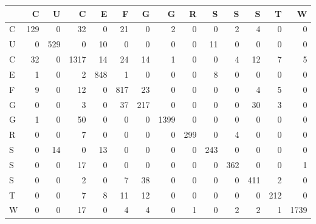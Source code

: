 \begin{tabular}{lrrrrrrrrrrrrr}
\toprule
{} &    C &    U &     C &    E &    F &    G &     G &    R &    S &    S &    S &    T &     W \\
\midrule
C &  129 &    0 &    32 &    0 &   21 &    0 &     2 &    0 &    0 &    2 &    4 &    0 &     0 \\
U &    0 &  529 &     0 &   10 &    0 &    0 &     0 &    0 &   11 &    0 &    0 &    0 &     0 \\
C &   32 &    0 &  1317 &   14 &   24 &   14 &     1 &    0 &    0 &    4 &   12 &    7 &     5 \\
E &    1 &    0 &     2 &  848 &    1 &    0 &     0 &    0 &    8 &    0 &    0 &    0 &     0 \\
F &    9 &    0 &    12 &    0 &  817 &   23 &     0 &    0 &    0 &    0 &    4 &    5 &     0 \\
G &    0 &    0 &     3 &    0 &   37 &  217 &     0 &    0 &    0 &    0 &   30 &    3 &     0 \\
G &    1 &    0 &    50 &    0 &    0 &    0 &  1399 &    0 &    0 &    0 &    0 &    0 &     0 \\
R &    0 &    0 &     7 &    0 &    0 &    0 &     0 &  299 &    0 &    4 &    0 &    0 &     0 \\
S &    0 &   14 &     0 &   13 &    0 &    0 &     0 &    0 &  243 &    0 &    0 &    0 &     0 \\
S &    0 &    0 &    17 &    0 &    0 &    0 &     0 &    0 &    0 &  362 &    0 &    0 &     1 \\
S &    0 &    0 &     2 &    0 &    7 &   38 &     0 &    0 &    0 &    0 &  411 &    2 &     0 \\
T &    0 &    0 &     7 &    8 &   11 &   12 &     0 &    0 &    0 &    0 &    0 &  212 &     0 \\
W &    0 &    0 &    17 &    0 &    4 &    4 &     0 &    1 &    0 &    2 &    2 &    1 &  1739 \\
\bottomrule
\end{tabular}
